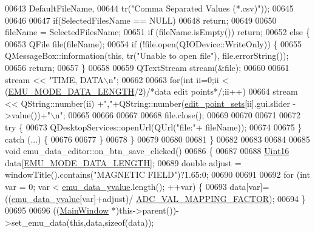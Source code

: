 \begin{DoxyCode}
{00643         DefaultFileName,
00644         tr(\textcolor{stringliteral}{"Comma Separated Values (*.csv)"}));
00645 
00646 
00647     \textcolor{keywordflow}{if}(SelectedFilesName == NULL)
00648         \textcolor{keywordflow}{return};
00649 
00650      fileName = SelectedFilesName;
00651     \textcolor{keywordflow}{if} (fileName.isEmpty()) \textcolor{keywordflow}{return};
00652     \textcolor{keywordflow}{else} \{
00653         QFile file(fileName);
00654         \textcolor{keywordflow}{if} (!file.open(QIODevice::WriteOnly)) \{
00655             QMessageBox::information(\textcolor{keyword}{this}, tr(\textcolor{stringliteral}{"Unable to open file"}), file.errorString());
00656             \textcolor{keywordflow}{return};
00657         \}
00658 
00659         QTextStream stream(&file);
00660 
00661         stream << \textcolor{stringliteral}{"TIME, DATA\(\backslash\)n"};
00662 
00663         \textcolor{keywordflow}{for}(\textcolor{keywordtype}{int} ii=0;ii < (\hyperlink{a00006_af4c3a8ad94feb4d7bda7f107f34baf41}{EMU\_MODE\_DATA\_LENGTH}/2)\textcolor{comment}{/*data edit points*/};ii++)
00664            stream << QString::number(ii) +\textcolor{stringliteral}{","}+QString::number(\hyperlink{a00008_ab093b86d07b4eb96c36878089a7d97df}{edit\_point\_sets}[ii].gui.slider
      ->value())+\textcolor{stringliteral}{"\(\backslash\)n"};
00665 
00666 
00667 
00668         file.close();
00669 
00670 
00671 
00672         \textcolor{keywordflow}{try} \{
00673             QDesktopServices::openUrl(QUrl(\textcolor{stringliteral}{"file:"}+ fileName));
00674 
00675         \} \textcolor{keywordflow}{catch} (...) \{
00676 
00677         \}
00678     \}
00679 
00680 
00681 \}
00682 
00683 
00684 
00685 \textcolor{keywordtype}{void} emu\_data\_editor::on\_btn\_save\_clicked()
00686 \{
00687 
00688     \hyperlink{a00004_aae7407b021d43f7193a81a58cfb3e297}{Uint16} data[\hyperlink{a00006_af4c3a8ad94feb4d7bda7f107f34baf41}{EMU\_MODE\_DATA\_LENGTH}];
00689     \textcolor{keywordtype}{double} adjust = windowTitle().contains(\textcolor{stringliteral}{"MAGNETIC FIELD"})?1.65:0;
00690 
00691 
00692     \textcolor{keywordflow}{for} (\textcolor{keywordtype}{int} var = 0; var < \hyperlink{a00008_ad922d05d1e988d84f404c115fe909f72}{emu\_data\_yvalue}.length(); ++var) \{
00693          data[var]=((\hyperlink{a00008_ad922d05d1e988d84f404c115fe909f72}{emu\_data\_yvalue}[var]+adjust)/
      \hyperlink{a00086_ada92d3eeeec0cbeee41e76a52d145792}{ADC\_VAL\_MAPPING\_FACTOR});
00694     \}
00695 
00696     ((\hyperlink{a00017}{MainWindow} *)this->parent())->set\_emu\_data(\textcolor{keyword}{this},data,\textcolor{keyword}{sizeof}(data));
}
\end{DoxyCode}
